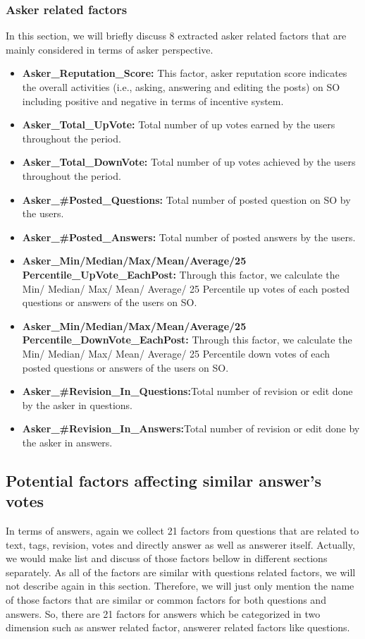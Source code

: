 \documentclass[conference]{IEEEtran}
\begin{document}
	\subsubsection{Asker related factors}\label{AF}
	In this section, we will briefly discuss 8 extracted asker related factors that are mainly considered in terms of asker perspective.
	\begin{itemize}
		\item \textbf{Asker\_Reputation\_Score: } This factor, asker reputation score indicates the overall activities (i.e., asking, answering and editing the posts) on SO including positive and negative in terms of incentive system. 
		\item \textbf{Asker\_Total\_UpVote: } Total number of up votes earned by the users throughout the period.
		\item \textbf{Asker\_Total\_DownVote: } Total number of up votes achieved by the users throughout the period.
		\item \textbf{Asker\_\#Posted\_Questions: }Total number of posted question on SO by the users.
		\item \textbf{Asker\_\#Posted\_Answers: } Total number of posted answers by the users.  
		\item \textbf{Asker\_Min/Median/Max/Mean/Average/25 Percentile\_UpVote\_EachPost:} Through this factor, we calculate the  Min/ Median/ Max/ Mean/ Average/ 25 Percentile up votes of each posted questions or answers of the users on SO.
		\item \textbf{Asker\_Min/Median/Max/Mean/Average/25 Percentile\_DownVote\_EachPost:} Through this factor, we calculate the  Min/ Median/ Max/ Mean/ Average/ 25 Percentile down votes of each posted questions or answers of the users on SO.
		\item \textbf{Asker\_\#Revision\_In\_Questions:}Total number of revision or edit done by the asker in questions.
		\item \textbf{Asker\_\#Revision\_In\_Answers:}Total number of revision or edit done by the asker in answers.
	\end{itemize}


\subsection{Potential factors affecting similar answer's votes}
In terms of answers, again we collect 21 factors from questions that are related to text, tags, revision, votes and directly answer as well as answerer itself.  Actually, we would make list and discuss of those factors bellow in different sections separately. As all of the factors are similar with questions related factors, we will not describe again in this section. Therefore, we will just only mention the name of those factors that are similar or common factors for both questions and answers. So, there are 21 factors for answers which be categorized in two dimension such as answer related factor, answerer related factors like questions. 
\end{document}
